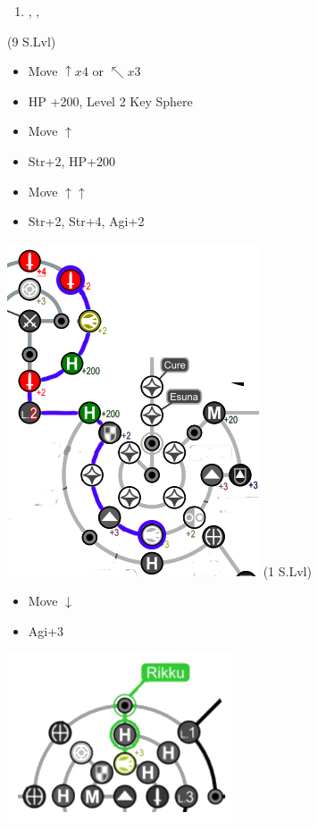 \begin{enumerate}[resume]
	\item \cs[1:50], \sd, \sd
\end{enumerate}
\colend
\begin{spheregrid}
	\begin{multicols}{2}
		\begin{itemize}
			\yunaf (9 S.Lvl)
			\begin{itemize}
				\item Move $\uparrow x4$ or $\nwarrow x3$
				\item HP +200, Level 2 Key Sphere
				\item Move $\uparrow$
				\item Str+2, HP+200
				\item Move $\uparrow\uparrow$
				\item Str+2, Str+4, Agi+2
			\end{itemize}
			\includegraphics[width=.6\columnwidth]{graphics/Yuna_post_spheremorph}
			\columnbreak
			\rikkuf (1 S.Lvl)
			\begin{itemize}
				\item Move $\downarrow$
				\item Agi+3
			\end{itemize}
			\includegraphics[width=.5\columnwidth]{graphics/macalaniarikku}

\end{itemize}
\end{multicols}
\end{spheregrid}
